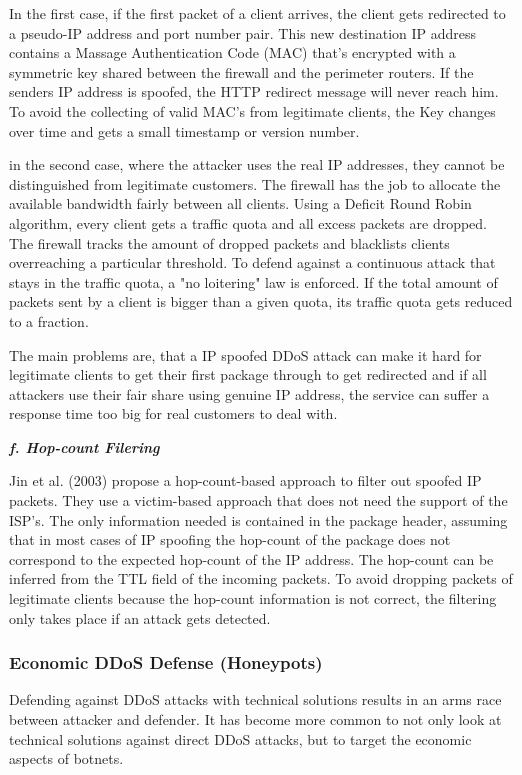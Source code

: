 In the first case, if the first packet of a client arrives, the client gets redirected to a pseudo-IP address and port number pair. This new destination IP address contains a Massage Authentication Code (MAC) that's encrypted with a symmetric key shared between the firewall and the perimeter routers. If the senders IP address is spoofed, the HTTP redirect message will never reach him.
To avoid the collecting of valid MAC's from legitimate clients, the Key changes over time and gets a small timestamp or version number. \cite{Xu03}

in the second case, where the attacker uses the real IP addresses, they cannot be distinguished from legitimate customers. The firewall has the job to allocate the available bandwidth fairly between all clients. Using a Deficit Round Robin algorithm, every client gets a traffic quota and all excess packets are dropped. The firewall tracks the amount of dropped packets and blacklists clients overreaching a particular threshold. To defend against a continuous attack that stays in the traffic quota, a "no loitering" law is enforced. If the total amount of packets sent by a client is bigger than a given quota, its traffic quota gets reduced to a fraction. \cite{Xu03}

The main problems are, that a IP spoofed DDoS attack can make it hard for legitimate clients to get their first package through to get redirected and if all attackers use their fair share using genuine IP address, the service can suffer a response time too big for real customers to deal with. \cite{Xu03}

\textbf{\textit{f. Hop-count Filering}}

Jin et al. (2003) propose a hop-count-based approach to filter out spoofed IP packets. They use a victim-based approach that does not need the support of the ISP's. The only information needed is contained in the package header, assuming that in most cases of IP spoofing the hop-count of the package does not correspond to the expected hop-count of the IP address. The hop-count can be inferred from the TTL field of the incoming packets. To avoid dropping packets of legitimate clients because the hop-count information is not correct, the filtering only takes place if an attack gets detected. \cite{Jin03} 

		\subsubsection{Economic DDoS Defense (Honeypots)}
Defending against DDoS attacks with technical solutions results in an arms race between attacker and defender. It has become more common to not only look at technical solutions against direct DDoS attacks, but to target the economic aspects of botnets.

